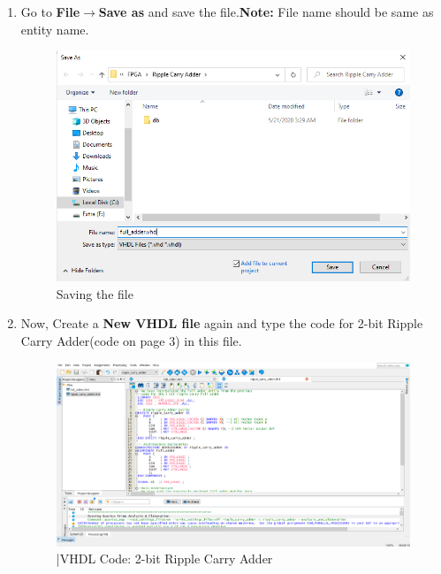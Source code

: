 \documentclass[12pt,singleside,a4paper]{article}
\begin{document}
\begin{enumerate}
    \item Go to \textbf{File}$\rightarrow$\textbf{Save as} and save the file.\textbf{Note:} File name should be same as entity name.
    \begin{figure}[H]
        \centering
    \includegraphics[width=14cm,keepaspectratio]{img4.png}
    \caption{Saving the file}
    \end{figure}
    \newpage
    \item Now, Create a \textbf{New VHDL file} again and type the code for 2-bit Ripple Carry Adder(code on page 3) in this file.
    \begin{figure}[H]
        \centering
    \includegraphics[width=14cm,keepaspectratio]{img4_1.png}
    \caption{|VHDL Code: 2-bit Ripple Carry Adder}
    \end{figure}
    

\end{enumerate}
\end{document}
